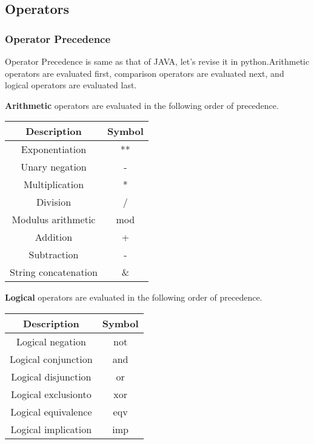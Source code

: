\documentclass[a4paper,9pt]{extarticle}
\begin{document}
\begin{multicols*}{2}
\section{Operators}
\subsubsection{Operator Precedence}
Operator Precedence is same as that of JAVA, let's revise it in python.Arithmetic operators are evaluated first, comparison operators are evaluated next, and logical operators are evaluated last.

\textbf{Arithmetic} operators are evaluated in the following order of precedence.

\begin{center}
 \begin{tabular}{||c c||}
 \hline
 \textbf{Description} & \textbf{Symbol} \\ [1ex]
 \hline\hline
 Exponentiation & ** \\
 \hline
 Unary negation & - \\
 \hline
 Multiplication & * \\
 \hline
 Division & / \\
 \hline
 Modulus arithmetic & mod \\
 \hline
 Addition & + \\
 \hline
 Subtraction & - \\
 \hline
 String concatenation & \& \\
 \hline
\end{tabular}
\end{center}

\textbf{Logical} operators are evaluated in the following order of precedence.

\begin{center}
 \begin{tabular}{||c c||}
 \hline
 \textbf{Description} & \textbf{Symbol} \\ [1ex]
 \hline\hline
 Logical negation & not \\
 \hline
 Logical conjunction & and \\
 \hline
 Logical disjunction & or \\
 \hline
 Logical exclusionto & xor \\
 \hline
 Logical equivalence & eqv \\
 \hline
 Logical implication & imp \\
 \hline
\end{tabular}
\end{center}


\end{multicols*}
\end{document}
